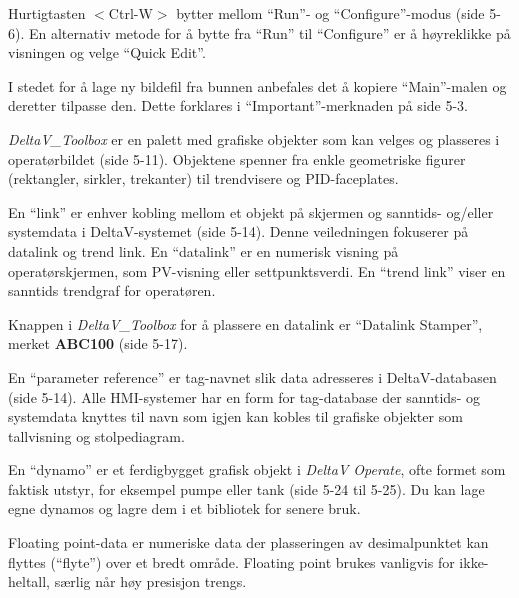 












Hurtigtasten $<$Ctrl-W$>$ bytter mellom ``Run''- og ``Configure''-modus (side 5-6). En alternativ metode for å bytte fra ``Run'' til ``Configure'' er å høyreklikke på visningen og velge ``Quick Edit''.

\vskip 10pt

I stedet for å lage ny bildefil fra bunnen anbefales det å kopiere ``Main''-malen og deretter tilpasse den. Dette forklares i ``Important''-merknaden på side 5-3.

\vskip 10pt

{\it DeltaV\_Toolbox} er en palett med grafiske objekter som kan velges og plasseres i operatørbildet (side 5-11). Objektene spenner fra enkle geometriske figurer (rektangler, sirkler, trekanter) til trendvisere og PID-faceplates.

\vskip 10pt

En ``link'' er enhver kobling mellom et objekt på skjermen og sanntids- og/eller systemdata i DeltaV-systemet (side 5-14). Denne veiledningen fokuserer på datalink og trend link. En ``datalink'' er en numerisk visning på operatørskjermen, som PV-visning eller settpunktsverdi. En ``trend link'' viser en sanntids trendgraf for operatøren.

Knappen i {\it DeltaV\_Toolbox} for å plassere en datalink er ``Datalink Stamper'', merket {\bf ABC100} (side 5-17).

\vskip 10pt

En ``parameter reference'' er tag-navnet slik data adresseres i DeltaV-databasen (side 5-14). Alle HMI-systemer har en form for tag-database der sanntids- og systemdata knyttes til navn som igjen kan kobles til grafiske objekter som tallvisning og stolpediagram.

\vskip 10pt

En ``dynamo'' er et ferdigbygget grafisk objekt i {\it DeltaV Operate}, ofte formet som faktisk utstyr, for eksempel pumpe eller tank (side 5-24 til 5-25). Du kan lage egne dynamos og lagre dem i et bibliotek for senere bruk.

\vskip 10pt

Floating point-data er numeriske data der plasseringen av desimalpunktet kan flyttes (``flyte'') over et bredt område. Floating point brukes vanligvis for ikke-heltall, særlig når høy presisjon trengs.



